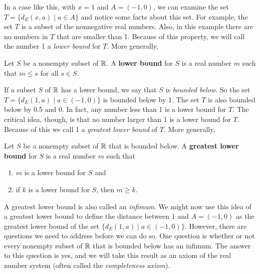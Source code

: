 In a case like this, with $x=1$ and $A = (-1,0)$, we can examine the set $T=\{d_E(x,a) \mid a \in A\}$ and notice some facts about this set. For example, the set $T$ is a subset of the nonnegative real numbers. Also, in this example there are no numbers in $T$ that are smaller than 1. Because of this property, we will call the number 1 a \emph{lower bound} for $T$. More generally,



\begin{definition} Let $S$ be a nonempty subset of $\mathbb{R}$. A \textbf{lower bound} for $S$ is a real number $m$ such that $m \leq s$ for all $s \in S$. 
\end{definition}

If a subset $S$ of $\mathbb{R}$ has a lower bound, we say that $S$ is \emph{bounded below}. So the set $T = \{d_E(1,a) \mid a \in (-1,0)\}$ is bounded below by 1. The set $T$ is also bounded below by 0.5 and 0. In fact, any number less than 1 is a lower bound for $T$. The critical idea, though, is that no number larger than 1 is a lower bound for $T$. Because of this we call 1 a \emph{greatest lower bound} of $T$. More generally,

\begin{definition} Let $S$ be a nonempty subset of $\mathbb{R}$ that is bounded below. A \textbf{greatest lower bound} for $S$ is a real number $m$ such that 
\begin{enumerate}
\item $m$ is a lower bound for $S$ and
\item if $k$ is a lower bound for $S$, then $m \geq k$. 
\end{enumerate}
\end{definition}

A greatest lower bound is also called an \emph{infimum}. We might now use this idea of a greatest lower bound to define the distance between $1$ and $A = (-1,0)$ as the greatest lower bound of the set $\{d_E(1,a) \mid a \in (-1,0)\}$. However, there are questions we need to address before we can do so. One question is whether or not every nonempty subset of $\mathbb{R}$ that is bounded below has an infimum. The answer to this question is yes, and we will take this result as an axiom of the real number system (often called the \emph{completeness axiom}). 


